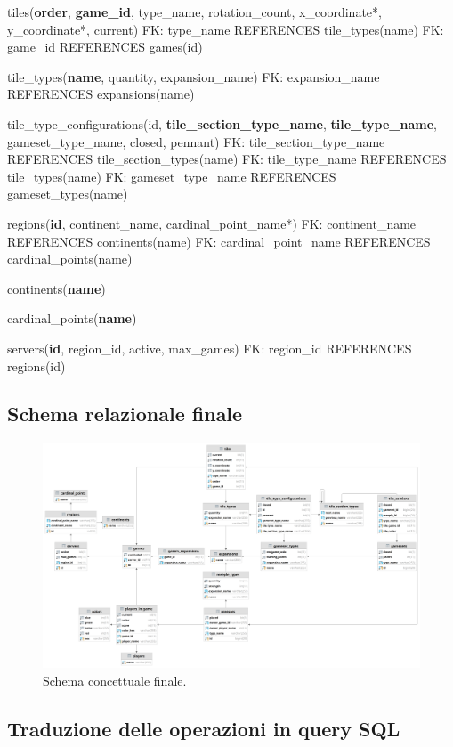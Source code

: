 tiles(\textbf{order}, \textbf{game\_id}, type\_name, rotation\_count, x\_coordinate*, y\_coordinate*, current)\newline
FK: type\_name REFERENCES tile\_types(name)\newline
FK: game\_id REFERENCES games(id)\newline

tile\_types(\textbf{name}, quantity, expansion\_name)\newline
FK: expansion\_name REFERENCES expansions(name)\newline

tile\_type\_configurations(id, \textbf{tile\_section\_type\_name}, \textbf{tile\_type\_name}, gameset\_type\_name, closed, pennant)\newline
FK: tile\_section\_type\_name REFERENCES tile\_section\_types(name)\newline
FK: tile\_type\_name REFERENCES tile\_types(name)\newline
FK: gameset\_type\_name REFERENCES gameset\_types(name)\newline

regions(\textbf{id}, continent\_name, cardinal\_point\_name*)\newline
FK: continent\_name REFERENCES continents(name)\newline
FK: cardinal\_point\_name REFERENCES cardinal\_points(name)\newline

continents(\textbf{name})\newline

cardinal\_points(\textbf{name})\newline

servers(\textbf{id}, region\_id, active, max\_games)\newline
FK: region\_id REFERENCES regions(id)

\subsection{Schema relazionale finale}
\begin{figure}[hb]
    \centering\includegraphics[scale=0.06]{images/Progettazione/relazionale.png}
    \caption{Schema concettuale finale.}
\end{figure}

\subsection{Traduzione delle operazioni in query SQL}
